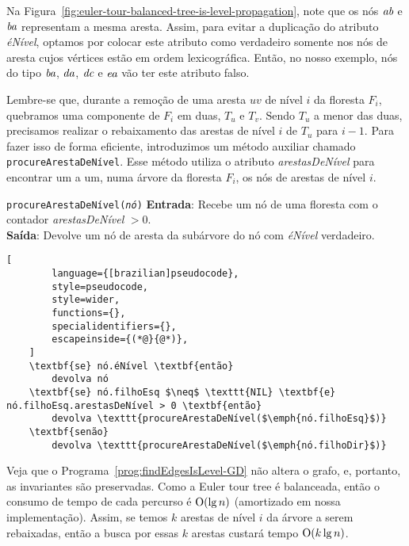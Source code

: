 Na Figura~\ref{fig:euler-tour-balanced-tree-is-level-propagation}, note que os nós $\emph{ab}$ e $\emph{ba}$ representam a mesma aresta. Assim, para evitar a duplicação do atributo \textit{éNível}, optamos por colocar este atributo como verdadeiro somente nos nós de aresta cujos vértices estão em ordem lexicográfica. Então, no nosso exemplo, nós do tipo $\emph{ba}$, $\emph{da}$, $\emph{dc}$ e $\emph{ea}$ vão ter este atributo falso. 

Lembre-se que, durante a remoção de uma aresta $uv$ de nível $i$ da floresta $F_i$, quebramos uma componente de $F_i$ em duas, $T_u$ e $T_v$. Sendo $T_u$ a menor das duas, precisamos realizar o rebaixamento das arestas de nível $i$ de $T_u$ para $i-1$. Para fazer isso de forma eficiente, introduzimos um método auxiliar chamado \texttt{procureArestaDeNível}. Esse método utiliza o atributo \textit{arestasDeNível} para encontrar um a um, numa árvore da floresta $F_i$, os nós de arestas de nível $i$.

\begin{programruledcaption}{\texttt{procureArestaDeNível(\textit{nó})} \label{prog:findEdgesIsLevel-GD}}
    \noindent\textbf{Entrada}: Recebe um nó de uma floresta com o contador \textit{arestasDeNível} $> 0$.
    \\
    \noindent\textbf{Saída}: Devolve um nó de aresta da subárvore do nó com \textit{éNível} verdadeiro.
    \vspace{-0.5\baselineskip}
    \begin{lstlisting}[
        language={[brazilian]pseudocode},
        style=pseudocode,
        style=wider,
        functions={},
        specialidentifiers={},
        escapeinside={(*@}{@*)},
    ]
    \textbf{se} nó.éNível \textbf{então}
        devolva nó
    \textbf{se} nó.filhoEsq $\neq$ \texttt{NIL} \textbf{e} nó.filhoEsq.arestasDeNível > 0 \textbf{então}
        devolva \texttt{procureArestaDeNível($\emph{nó.filhoEsq}$)}
    \textbf{senão}
        devolva \texttt{procureArestaDeNível($\emph{nó.filhoDir}$)}
\end{lstlisting}
\vspace{-0.5\baselineskip}
\end{programruledcaption}

Veja que o Programa~\ref{prog:findEdgesIsLevel-GD} não altera o grafo, e, portanto, as invariantes são preservadas. Como a Euler tour tree é balanceada, então o consumo de tempo de cada percurso é $\mathrm{O}(\lg n)$ (amortizado em nossa implementação). Assim, se temos $k$ arestas de nível $i$ da árvore a serem rebaixadas, então a busca por essas $k$ arestas custará tempo $\mathrm{O}(k \lg n)$.

